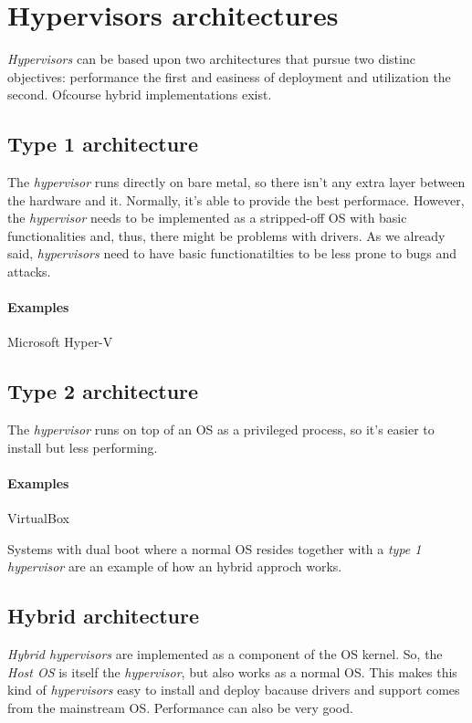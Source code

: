 \section{Hypervisors architectures}
\emph{Hypervisors} can be based upon two architectures that pursue two
distinc objectives: performance the first and easiness of deployment
and utilization the second. Ofcourse hybrid implementations exist.

\subsection{Type 1 architecture}
The \emph{hypervisor} runs directly on bare metal, so there isn't any extra
layer between the hardware and it. Normally, it's able to provide the best
performace. However, the \emph{hypervisor} needs to be implemented as a
stripped-off OS with basic functionalities and, thus, there might be problems
with drivers. As we already said, \emph{hypervisors} need to have basic
functionatilties to be less prone to bugs and attacks.

\paragraph{Examples} Microsoft Hyper-V

\subsection{Type 2 architecture}
The \emph{hypervisor} runs on top of an OS as a privileged process, so it's
easier to install but less performing.

\paragraph{Examples} VirtualBox

\begin{note}
    Systems with dual boot where a normal OS resides together with a \emph{type
    1 hypervisor} are an example of how an hybrid approch works.
\end{note}

\subsection{Hybrid architecture}
\emph{Hybrid hypervisors} are implemented as a component of the OS kernel.
So, the \emph{Host OS} is itself the \emph{hypervisor}, but also works as a
normal OS. This makes this kind of \emph{hypervisors} easy to install and deploy
bacause drivers and support comes from the mainstream OS. Performance can also
be very good.

